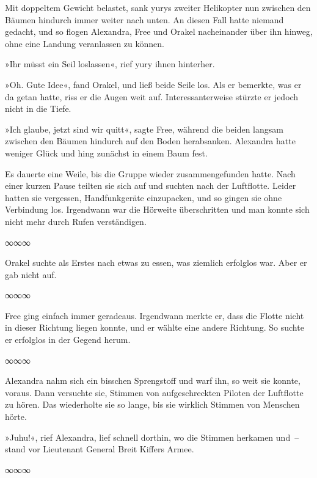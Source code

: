 Mit doppeltem Gewicht belastet, sank yurys zweiter Helikopter nun zwischen den Bäumen hindurch immer weiter nach unten. An diesen Fall hatte niemand gedacht, und so flogen Alexandra, Free und Orakel nacheinander über ihn hinweg, ohne eine Landung veranlassen zu können.

»Ihr müsst ein Seil loslassen«, rief yury ihnen hinterher.

»Oh. Gute Idee«, fand Orakel, und ließ beide Seile los. Als er bemerkte, was er da getan hatte, riss er die Augen weit auf. Interessanterweise stürzte er jedoch nicht in die Tiefe.

»Ich glaube, jetzt sind wir quitt«, sagte Free, während die beiden langsam zwischen den Bäumen hindurch auf den Boden herabsanken. Alexandra hatte weniger Glück und hing zunächst in einem Baum fest.

Es dauerte eine Weile, bis die Gruppe wieder zusammengefunden hatte. Nach einer kurzen Pause teilten sie sich auf und suchten nach der Luftflotte. Leider hatten sie vergessen, Handfunkgeräte einzupacken, und so gingen sie ohne Verbindung los. Irgendwann war die Hörweite überschritten und man konnte sich nicht mehr durch Rufen verständigen.

\begin{center}
    ∞∞∞
\end{center}

Orakel suchte als Erstes nach etwas zu essen, was ziemlich erfolglos war. Aber er gab nicht auf.

\begin{center}
    ∞∞∞
\end{center}

Free ging einfach immer geradeaus. Irgendwann merkte er, dass die Flotte nicht in dieser Richtung liegen konnte, und er wählte eine andere Richtung. So suchte er erfolglos in der Gegend herum.

\begin{center}
    ∞∞∞
\end{center}

Alexandra nahm sich ein bisschen Sprengstoff und warf ihn, so weit sie konnte, voraus. Dann versuchte sie, Stimmen von aufgeschreckten Piloten der Luftflotte zu hören. Das wiederholte sie so lange, bis sie wirklich Stimmen von Menschen hörte.

»Juhu!«, rief Alexandra, lief schnell dorthin, wo die Stimmen herkamen und~– stand vor Lieutenant General Breit Kiffers Armee.

\begin{center}
    ∞∞∞
\end{center}

